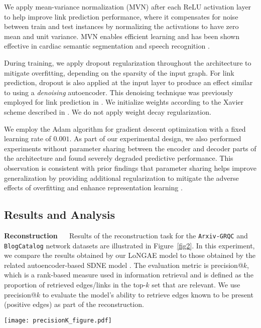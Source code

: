 \documentclass[letterpaper, conference]{IEEEtran}
\begin{document}
We apply mean-variance normalization (MVN) after each ReLU activation layer to help improve link prediction performance, where it compensates for noise between train and test instances by normalizing the activations to have zero mean and unit variance. MVN enables efficient learning and has been shown effective in cardiac semantic segmentation \cite{Tran:2016} and speech recognition \cite{Joshi:2016}.

During training, we apply dropout regularization \cite{Srivastava:2014} throughout the architecture to mitigate overfitting, depending on the sparsity of the input graph. For link prediction, dropout is also applied at the input layer to produce an effect similar to using a \emph{denoising} autoencoder. This denoising technique was previously employed for link prediction in \cite{Chen:2014}. We initialize weights according to the Xavier scheme described in \cite{Xavier:2010}. We do not apply weight decay regularization.

We employ the Adam algorithm \cite{Kingma:2015} for gradient descent optimization with a fixed learning rate of $0.001$. As part of our experimental design, we also performed experiments without parameter sharing between the encoder and decoder parts of the architecture and found severely degraded predictive performance. This observation is consistent with prior findings that parameter sharing helps improve generalization by providing additional regularization to mitigate the adverse effects of overfitting and enhance representation learning \cite{Vukotic:2016,Yang:2017}.
\subsection{Results and Analysis}
\noindent \textbf{Reconstruction} ~~ Results of the reconstruction task for the \texttt{Arxiv-GRQC} and \texttt{BlogCatalog} network datasets are illustrated in Figure~\ref{fig2}. In this experiment, we compare the results obtained by our LoNGAE model to those obtained by the related autoencoder-based SDNE model \cite{Wang:2016}. The evaluation metric is precision@$k$, which is a rank-based measure used in information retrieval and is defined as the proportion of retrieved edges/links in the top-$k$ set that are relevant. We use precision@$k$ to evaluate the model's ability to retrieve edges known to be present (positive edges) as part of the reconstruction.

\begin{figure*}
\centering
\texttt{[image: precisionK\_figure.pdf]}
\centering
\caption{Comparison of precision@$k$ performance between our LoNGAE model and the related autoencoder-based SDNE model for the reconstruction task on the \texttt{Arxiv-GRQC} and \texttt{BlogCatalog} network datasets. The parameter $k$ indicates the total number of retrieved edges.}
\label{fig2}
\end{figure*}
\end{document}
